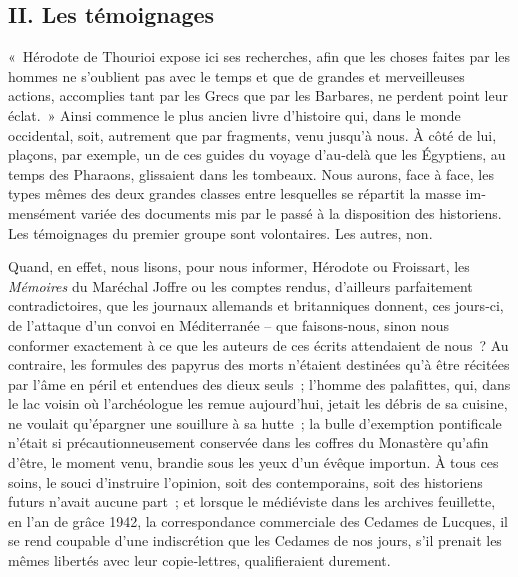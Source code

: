 \documentclass[french,twoside]{book} %
\begin{document}
\subsection[{II. Les témoignages}]{II. Les témoignages}
\noindent « Hérodote de Thourioi expose ici ses recherches, afin que les choses faites par les hommes ne s’oublient pas avec le temps et que de grandes et merveilleuses actions, accomplies tant par les Grecs que par les Bar­bares, ne perdent point leur éclat. » Ainsi commence le plus ancien livre d’histoire qui, dans le monde occidental, soit, autrement que par  
\label{p24} fragments, venu jusqu’à nous. À côté de lui, plaçons, par exemple, un de ces guides du voyage d’au-delà que les Égyptiens, au temps des Pha­raons, glissaient dans les tombeaux. Nous aurons, face à face, les types mêmes des deux grandes classes entre lesquelles se répartit la masse im­mensément variée des documents mis par le passé à la disposition des historiens. Les témoignages du premier groupe sont volontaires. Les autres, non.\par
Quand, en effet, nous lisons, pour nous informer, Hérodote ou Froissart, les \emph{Mémoires} du Maréchal Joffre ou les comptes rendus, d’ailleurs parfai­tement contradictoires, que les journaux allemands et britanniques donnent, ces jours‑ci, de l’attaque d’un convoi en Méditerranée – que faisons‑nous, sinon nous conformer exactement à ce que les auteurs de ces écrits attendaient de nous ? Au contraire, les formules des papyrus des morts n’étaient destinées qu’à être récitées par l’âme en péril et enten­dues des dieux seuls ; l’homme des palafittes, qui, dans le lac voisin où l’archéologue les remue aujourd’hui, jetait les débris de sa cuisine, ne voulait qu’épargner une souillure à sa hutte ; la bulle d’exemption ponti­ficale n’était si précautionneusement conservée dans les coffres du Monas­tère qu’afin d’être, le moment venu, brandie sous les yeux d’un évêque importun. À tous ces soins, le souci d’instruire l’opinion, soit des contem­porains, soit des historiens futurs n’avait aucune part ; et lorsque le médiéviste dans les archives feuillette, en l’an de grâce 1942, la corres­pondance commerciale des Cedames de Lucques, il se rend coupable d’une indiscrétion que les Cedames de nos jours, s’il prenait les mêmes libertés avec leur copie‑lettres, qualifieraient durement.\par
\end{document}
